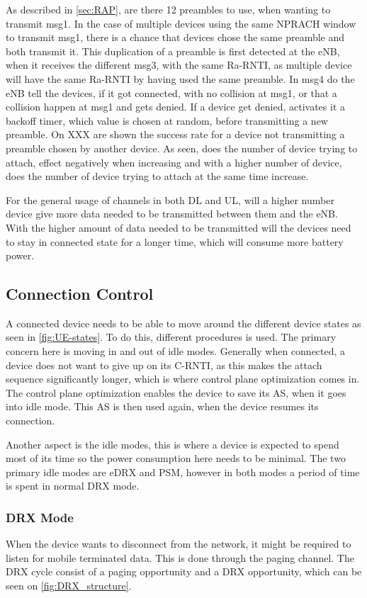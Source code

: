 As described in \autoref{sec:RAP}, are there 12 preambles to use, when wanting to transmit msg1. In the case of multiple devices using the same NPRACH window to transmit msg1, there is a chance that devices chose the same preamble and both transmit it. This duplication of a preamble is first detected at the eNB, when it receives the different msg3, with the same Ra-RNTI, as multiple device will have the same Ra-RNTI by having used the same preamble. In msg4 do the eNB tell the devices, if it got connected, with no collision at msg1, or that a collision happen at msg1 and gets denied. If a device get denied, activates it a backoff timer, which value is chosen at random, before transmitting a new preamble. On XXX are shown the success rate for a device not transmitting a preamble chosen by another device. As seen, does the number of device trying to attach, effect negatively when increasing and with a higher number of device, does the number of device trying to attach at the same time increase.


For the general usage of channels in both DL and UL, will a higher number device give more data needed to be transmitted between them and the eNB. With the higher amount of data needed to be transmitted will the devices need to stay in connected state for a longer time, which will consume more battery power. 

\subsection{Connection Control}
A connected device needs to be able to move around the different device states as seen in \autoref{fig:UE-states}. To do this, different procedures is used. The primary concern here is moving in and out of idle modes. Generally when connected, a device does not want to give up on its \gls{C-RNTI}, as this makes the attach sequence significantly longer, which is where control plane optimization comes in. The control plane optimization enables the device to save its \gls{AS}, when it goes into idle mode. This \gls{AS} is then used again, when the device resumes its connection. 

Another aspect is the idle modes, this is where a device is expected to spend most of its time so the power consumption here needs to be minimal. The two primary idle modes are \gls{eDRX} and \gls{PSM}, however in both modes a period of time is spent in normal DRX mode. 


\subsubsection{DRX Mode}
When the device wants to disconnect from the network, it might be required to listen for mobile terminated data. This is done through the paging channel. The DRX cycle consist of a paging opportunity and a DRX opportunity, which can be seen on \autoref{fig:DRX_structure}. 

